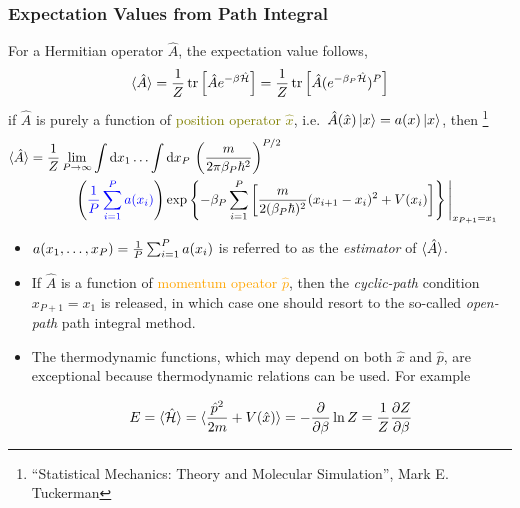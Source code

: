 \begin{frame}
  \frametitle{Expectation Values from Path Integral}
  For a Hermitian operator $\hat{A}$, the expectation value follows,
  \begin{equation*}
    \braket{\hat{A}} = \frac{1}{Z} \operatorname{tr}\left[\hat{A}e^{-\beta\hat{\cal H}}\right]
    = \frac{1}{Z} \operatorname{tr}\left[\hat{A}(e^{-{\beta_P}\hat{\cal H}})^P\right]
  \end{equation*}
  if $\hat{A}$ is purely a function of \textcolor{olive}{position operator $\hat{x}$}, i.e.\ $\hat{A}(\hat{x})\ket{x}
  = a(x)\ket{x}$, then
  \footnote{
   ``Statistical Mechanics: Theory and Molecular Simulation'', Mark E. Tuckerman 
  }
  \begin{align*}
    \braket{\hat{A}} &=
                       \frac{1}{Z}
                       \lim_{P\to\infty}
                       \int\dt{x_1}\ldots\int\dt{x_P}\,
                       \left(m \over2\pi\beta_P\hbar^2\right)^{P/2} \cr
    &\phantom{
                       \frac{1}{Z}
                       \lim_{P\to\infty}
                       } 
      \left( \mathcolor{blue}{{1\over P}\sum_{i=1}^P a(x_i)} \right)
        \exp\left\{
          \displaystyle
          -\beta_P
          \sum_{i=1}^P \left[
            {m\over2(\beta_P\hbar)^2} (x_{\tikzmark{ring_polymer_bc} i+1} - x_i)^2
            +
            V(x_i)
          \right]
        \right\} \Bigg|_{x_{P+1} = x_1}
  \end{align*}

  \begin{itemize}
    
  \item $a(x_1,\ldots,x_P) = \mathcolor{black}{{1\over P}\sum_{i=1}^P a(x_i)}$ is
    referred to as the \textsl{estimator} of $\braket{\hat{A}}$.
        
  \item If $\hat{A}$ is a function of \textcolor{orange}{momentum opeator $\hat{p}$}, then the
    \emph{cyclic-path} condition $x_{P+1} = x_1$ is released, in which case one should resort to
    the so-called \emph{open-path} path integral method.
  \item The thermodynamic functions, which may depend on both $\hat{x}$ and
    $\hat{p}$, are exceptional because thermodynamic relations can be used. For example


    \begin{equation*}
      E = \braket{\hat{\cal H}} = \braket{\frac{\hat{p}^2}{2m} + V(\hat{x})} 
      = -{\partial\over\partial\beta}\ln Z = {1\over Z}{\partial Z\over\partial\beta}
    \end{equation*}
  \end{itemize}
\end{frame}
